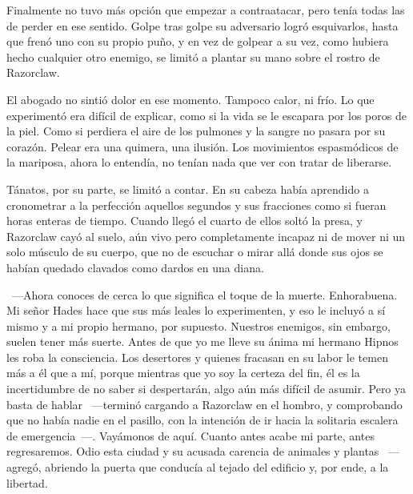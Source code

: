 Finalmente no tuvo más opción que empezar a contraatacar, pero tenía todas las de perder en ese sentido. Golpe tras golpe su adversario logró esquivarlos, hasta que frenó uno con su propio puño, y en vez de golpear a su vez, como hubiera hecho cualquier otro enemigo, se limitó a plantar su mano sobre el rostro de Razorclaw.

El abogado no sintió dolor en ese momento. Tampoco calor, ni frío. Lo que experimentó era difícil de explicar, como si la vida se le escapara por los poros de la piel. Como si perdiera el aire de los pulmones y la sangre no pasara por su corazón. Pelear era una quimera, una ilusión. Los movimientos espasmódicos de la mariposa, ahora lo entendía, no tenían nada que ver con tratar de liberarse.

Tánatos, por su parte, se limitó a contar. En su cabeza había aprendido a cronometrar a la perfección aquellos segundos y sus fracciones como si fueran horas enteras de tiempo. Cuando llegó el cuarto de ellos soltó la presa, y Razorclaw cayó al suelo, aún vivo pero completamente incapaz ni de mover ni un solo músculo de su cuerpo, que no de escuchar o mirar allá donde sus ojos se habían quedado clavados como dardos en una diana.

~---Ahora conoces de cerca lo que significa el toque de la muerte. Enhorabuena. Mi señor Hades hace que sus más leales lo experimenten, y eso le incluyó a sí mismo y a mi propio hermano, por supuesto. Nuestros enemigos, sin embargo, suelen tener más suerte. Antes de que yo me lleve su ánima mi hermano Hipnos les roba la consciencia. Los desertores y quienes fracasan en su labor le temen más a él que a mí, porque mientras que yo soy la certeza del fin, él es la incertidumbre de no saber si despertarán, algo aún más difícil de asumir. Pero ya basta de hablar ~---terminó cargando a Razorclaw en el hombro, y comprobando que no había nadie en el pasillo, con la intención de ir hacia la solitaria escalera de emergencia~---. Vayámonos de aquí. Cuanto antes acabe mi parte, antes regresaremos. Odio esta ciudad y su acusada carencia de animales y plantas ~---agregó, abriendo la puerta que conducía al tejado del edificio y, por ende, a la libertad.
